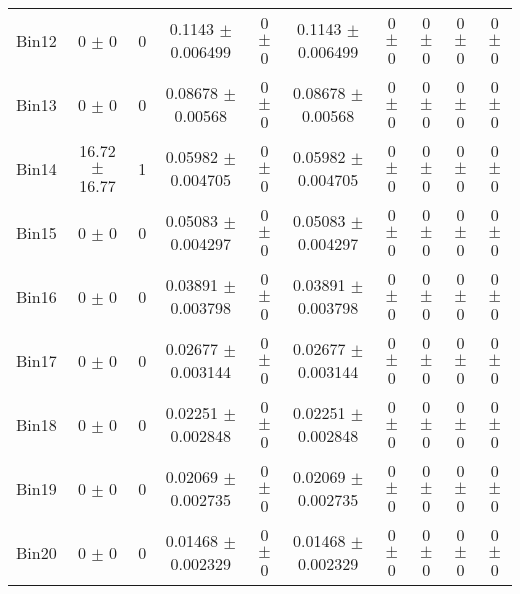 \begin{tabular}{@{\extracolsep{4pt}}lccccccccc@{}}
     Bin12 & 0 $\pm$ 0 & 0 & 0.1143 $\pm$ 0.006499 & 0 $\pm$ 0 & 0.1143 $\pm$ 0.006499 & 0 $\pm$ 0 & 0 $\pm$ 0 & 0 $\pm$ 0 & 0 $\pm$ 0 \\ 
     Bin13 & 0 $\pm$ 0 & 0 & 0.08678 $\pm$ 0.00568 & 0 $\pm$ 0 & 0.08678 $\pm$ 0.00568 & 0 $\pm$ 0 & 0 $\pm$ 0 & 0 $\pm$ 0 & 0 $\pm$ 0 \\ 
     Bin14 & 16.72 $\pm$ 16.77 & 1 & 0.05982 $\pm$ 0.004705 & 0 $\pm$ 0 & 0.05982 $\pm$ 0.004705 & 0 $\pm$ 0 & 0 $\pm$ 0 & 0 $\pm$ 0 & 0 $\pm$ 0 \\ 
     Bin15 & 0 $\pm$ 0 & 0 & 0.05083 $\pm$ 0.004297 & 0 $\pm$ 0 & 0.05083 $\pm$ 0.004297 & 0 $\pm$ 0 & 0 $\pm$ 0 & 0 $\pm$ 0 & 0 $\pm$ 0 \\ 
     Bin16 & 0 $\pm$ 0 & 0 & 0.03891 $\pm$ 0.003798 & 0 $\pm$ 0 & 0.03891 $\pm$ 0.003798 & 0 $\pm$ 0 & 0 $\pm$ 0 & 0 $\pm$ 0 & 0 $\pm$ 0 \\ 
     Bin17 & 0 $\pm$ 0 & 0 & 0.02677 $\pm$ 0.003144 & 0 $\pm$ 0 & 0.02677 $\pm$ 0.003144 & 0 $\pm$ 0 & 0 $\pm$ 0 & 0 $\pm$ 0 & 0 $\pm$ 0 \\ 
     Bin18 & 0 $\pm$ 0 & 0 & 0.02251 $\pm$ 0.002848 & 0 $\pm$ 0 & 0.02251 $\pm$ 0.002848 & 0 $\pm$ 0 & 0 $\pm$ 0 & 0 $\pm$ 0 & 0 $\pm$ 0 \\ 
     Bin19 & 0 $\pm$ 0 & 0 & 0.02069 $\pm$ 0.002735 & 0 $\pm$ 0 & 0.02069 $\pm$ 0.002735 & 0 $\pm$ 0 & 0 $\pm$ 0 & 0 $\pm$ 0 & 0 $\pm$ 0 \\ 
     Bin20 & 0 $\pm$ 0 & 0 & 0.01468 $\pm$ 0.002329 & 0 $\pm$ 0 & 0.01468 $\pm$ 0.002329 & 0 $\pm$ 0 & 0 $\pm$ 0 & 0 $\pm$ 0 & 0 $\pm$ 0 \\ 
\hline\hline
  \end{tabular}
